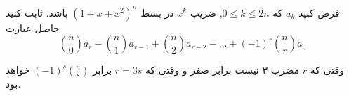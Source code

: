 \p
فرض کنید 
$a_k$
كه
$0 \leq k \leq 2n$,
 ضریب 
 $x^k$ در بسط $(1 + x + x^2)^n$ باشد.
ثابت کنید حاصل عبارت
$${n \choose 0}a_r - {n \choose 1}a_{r - 1} + {n \choose 2}a_{r - 2} - ... + (-1)^r{n \choose r}a_0$$

وقتی که $r$ مضرب ۳ نیست برابر صفر و وقتی که 
$r = 3s$ 
برابر 
$(-1)^s{n \choose s}$ 
خواهد بود.